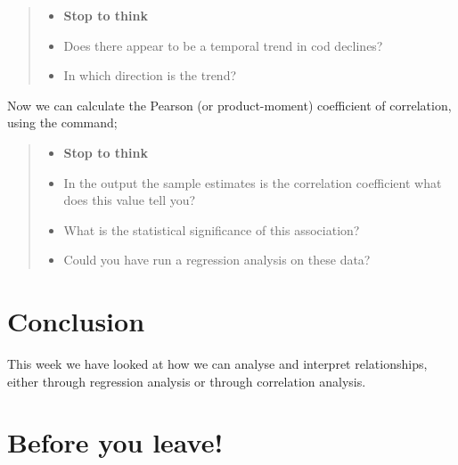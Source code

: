 \documentclass[
]{book}
\newenvironment{Shaded}{\begin{snugshade}}{\end{snugshade}}
\newcommand{\AttributeTok}[1]{\textcolor[rgb]{0.13,0.29,0.53}{#1}}
\newcommand{\CommentTok}[1]{\textcolor[rgb]{0.56,0.35,0.01}{\textit{#1}}}
\newcommand{\FunctionTok}[1]{\textcolor[rgb]{0.13,0.29,0.53}{\textbf{#1}}}
\newcommand{\NormalTok}[1]{#1}
\newcommand{\OtherTok}[1]{\textcolor[rgb]{0.56,0.35,0.01}{#1}}
\newcommand{\SpecialCharTok}[1]{\textcolor[rgb]{0.81,0.36,0.00}{\textbf{#1}}}
\newcommand{\StringTok}[1]{\textcolor[rgb]{0.31,0.60,0.02}{#1}}
\providecommand{\tightlist}{%
  \setlength{\itemsep}{0pt}\setlength{\parskip}{0pt}}
\begin{document}
\begin{quote}
\begin{itemize}
\tightlist
\item
  \textbf{Stop to think}
\item
  Does there appear to be a temporal trend in cod declines?
\item
  In which direction is the trend?
\end{itemize}
\end{quote}

Now we can calculate the Pearson (or product-moment) coefficient of correlation, using the command;

\begin{Shaded}
\end{Shaded}

\begin{quote}
\begin{itemize}
\tightlist
\item
  \textbf{Stop to think}
\item
  In the output the sample estimates is the correlation coefficient what does this value tell you?
\item
  What is the statistical significance of this association?
\item
  Could you have run a regression analysis on these data?
\end{itemize}
\end{quote}

\section{Conclusion}\label{conclusion-4}

This week we have looked at how we can analyse and interpret relationships, either through regression analysis or through correlation analysis.

\section{Before you leave!}\label{before-you-leave-4}
\end{document}
